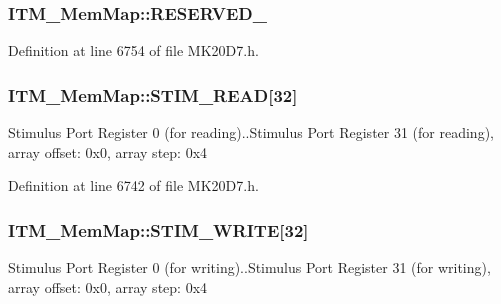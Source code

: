 \subsubsection[{\texorpdfstring{R\+E\+S\+E\+R\+V\+E\+D\+\_\+4}{RESERVED_4}}]{ I\+T\+M\+\_\+\+Mem\+Map\+::\+R\+E\+S\+E\+R\+V\+E\+D\+\_}\hypertarget{struct_i_t_m___mem_map_a3ad87c333c5b786c45db2fe6cca92d61}{}\label{struct_i_t_m___mem_map_a3ad87c333c5b786c45db2fe6cca92d61}


Definition at line 6754 of file M\+K20\+D7.\+h.

\subsubsection[{\texorpdfstring{S\+T\+I\+M\+\_\+\+R\+E\+AD}{STIM_READ}}]{ I\+T\+M\+\_\+\+Mem\+Map\+::\+S\+T\+I\+M\+\_\+\+R\+E\+AD\mbox{[}32\mbox{]}}\hypertarget{struct_i_t_m___mem_map_afb3f200b95047ddd2dc4b045887ebfa3}{}\label{struct_i_t_m___mem_map_afb3f200b95047ddd2dc4b045887ebfa3}
Stimulus Port Register 0 (for reading)..Stimulus Port Register 31 (for reading), array offset\+: 0x0, array step\+: 0x4 

Definition at line 6742 of file M\+K20\+D7.\+h.

\subsubsection[{\texorpdfstring{S\+T\+I\+M\+\_\+\+W\+R\+I\+TE}{STIM_WRITE}}]{ I\+T\+M\+\_\+\+Mem\+Map\+::\+S\+T\+I\+M\+\_\+\+W\+R\+I\+TE\mbox{[}32\mbox{]}}\hypertarget{struct_i_t_m___mem_map_a0ba1ca981edcde8bf08accc593fa1f52}{}\label{struct_i_t_m___mem_map_a0ba1ca981edcde8bf08accc593fa1f52}
Stimulus Port Register 0 (for writing)..Stimulus Port Register 31 (for writing), array offset\+: 0x0, array step\+: 0x4 

